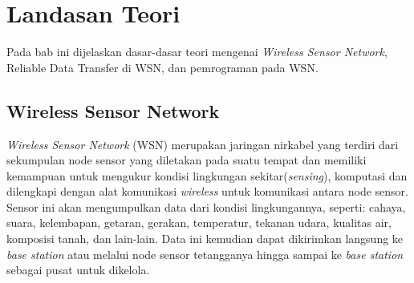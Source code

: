 \chapter{Landasan Teori}
\label{chap:teori}
Pada bab ini dijelaskan dasar-dasar teori mengenai \textit{Wireless Sensor Network}, Reliable Data Transfer di WSN, dan pemrograman pada WSN.

\section{Wireless Sensor Network}
\label{sec:wsn}
\textit{Wireless Sensor Network} (WSN) merupakan jaringan nirkabel yang terdiri dari sekumpulan node sensor yang diletakan pada suatu tempat dan memiliki kemampuan untuk mengukur kondisi lingkungan sekitar(\textit{sensing}), komputasi dan dilengkapi dengan alat komunikasi \textit{wireless} untuk komunikasi antara node sensor. Sensor ini akan mengumpulkan data dari kondisi lingkungannya, seperti: cahaya, suara, kelembapan, getaran, gerakan, temperatur, tekanan udara, kualitas air, komposisi tanah, dan lain-lain. Data ini kemudian dapat dikirimkan langsung ke \textit{base station} atau melalui node sensor tetangganya hingga sampai ke \textit{base station} sebagai pusat untuk dikelola.

